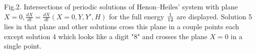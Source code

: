 \setlength{\textwidth}{14.0cm}
\setlength{\topmargin}{-1.0cm}
\setlength{\textheight}{21.0cm}


\thispagestyle{empty}


\noindent
Fig.2. Intersections of periodic solutions of 
Henon--Heiles' system with plane $X = 0,  
\frac{dX}{dt}=\frac{dX}{dt}(X=0,Y,Y',H)$ for the full energy 
${1 \over 12}$ are displayed. Solution 5 lies in that plane and
other solutions cross this plane in a couple points each except
solution 4 which looks like a digit "8" and crosses the plane $X=0$ 
in a single point.

\begin{figure}
\vspace{1cm}
\begin{center}



\end{center}
\end{figure}



